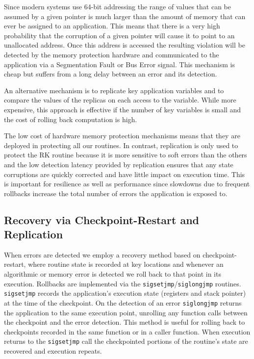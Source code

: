 \documentclass{sig-alternate}
\begin{document}
Since modern systems use 64-bit addressing the range of values that can be assumed by a given pointer is much larger than the amount of memory that can ever be assigned to an application.
This means that there is a very high probability that the corruption of a given pointer will cause it to point to an unallocated address.
Once this address is accessed the resulting violation will be detected by the memory protection hardware and communicated to the application via a Segmentation Fault or Bus Error signal.
This mechanism is cheap but suffers from a long delay between an error and its detection.

An alternative mechanism is to replicate key application variables and to compare the values of the replicas on each access to the variable.
While more expensive, this approach is effective if the number of key variables is small and the cost of rolling back computation is high.

The low cost of hardware memory protection mechanisms means that they are deployed in protecting all our routines.
In contrast, replication is only used to protect the RK routine because it is more sensitive to soft errors than the others and the low detection latency provided by replication ensures that any state corruptions are quickly corrected and have little impact on execution time.
This is important for resilience as well as performance since slowdowns due to frequent rollbacks increase the total number of errors the application is exposed to.

\subsection{Recovery via Checkpoint-Restart and \\Replication}
\label{sec:res_tech:cr}

When errors are detected we employ a recovery method based on checkpoint-restart, where routine state is recorded at key locations and whenever an algorithmic or memory error is detected we roll back to that point in its execution.
Rollbacks are implemented via the \texttt{sigsetjmp}/\texttt{siglongjmp} \cite{sigsetjmp:1997} routines.
\texttt{sigsetjmp} records the application's execution state (registers and stack pointer) at the time of the checkpoint.
On the detection of an error \texttt{siglongjmp} returns the application to the same execution point, unrolling any function calls between the checkpoint and the error detection.
This method is useful for rolling back to checkpoints recorded in the same function or in a caller function.
When execution returns to the \texttt{sigsetjmp} call the checkpointed portions of the routine's state are recovered and execution repeats.
\end{document}
